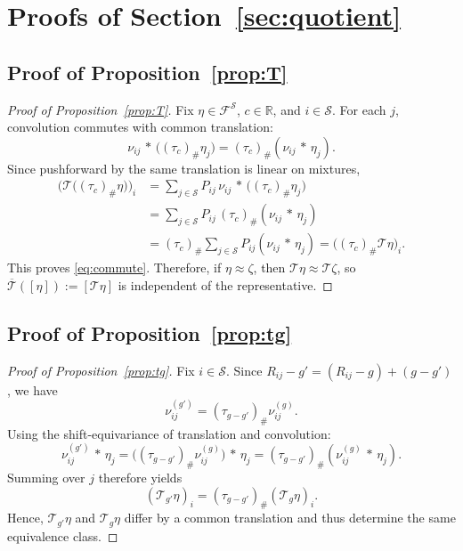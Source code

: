 \documentclass{article}
\newcommand{\X}{\mathcal{S}}
\newcommand{\R}{\mathbb{R}}
\begin{document}
\newpage
\section{Proofs of Section~\ref{sec:quotient}}\label{app:A}

\subsection{Proof of Proposition~\ref{prop:T}}
\begin{proof}[Proof of Proposition~\ref{prop:T}]
Fix $\eta \in \mathcal F^\X$, $c \in \R$, and $i \in \X$. For each $j$, convolution commutes with common translation:
\begin{equation}
\nu_{ij}\,\ast\,\bigl((\tau_c)_\# \eta_j \bigr) = (\tau_c)_\#(\nu_{ij}\,\ast\,\eta_j).
\end{equation}
Since pushforward by the same translation is linear on mixtures,
\begin{equation}
\begin{aligned}
\bigl(\mathcal T\bigl((\tau_c)_\#\eta\bigr)\bigr)_i &= \sum_{j \in \X}P_{ij} \,\nu_{ij}\,\ast\,\bigl((\tau_c)_\#\eta_j\bigr)\\
&=\sum_{j\in\X} P_{ij}\,(\tau_c)_\# (\nu_{ij}\,\ast\,\eta_j)\\
&=(\tau_c)_\# \sum_{j \in \X} P_{ij} (\nu_{ij}\,\ast\,\eta_j) = \bigl((\tau_c)_\# \mathcal T \eta \bigr)_i.
\end{aligned}
\end{equation}
This proves \eqref{eq:commute}. Therefore, if $\eta \approx \zeta$, then $\mathcal T \eta\approx \mathcal T \zeta$, so $\overline{\mathcal T}([\eta]) := [\mathcal T \eta]$ is independent of the representative.
\end{proof}

\subsection{Proof of Proposition~\ref{prop:tg}}
\begin{proof}[Proof of Proposition~\ref{prop:tg}]
Fix $i \in \X$. Since $R_{ij} - g' = (R_{ij} -g) + (g - g')$, we have
\begin{equation}
\nu^{(g')}_{ij} = (\tau_{g-g'})_\# \nu^{(g)}_{ij}.
\end{equation}
Using the shift-equivariance of translation and convolution:
\begin{equation}
\nu^{(g')}_{ij}\,\ast\,\eta_j = \bigl((\tau_{g-g'})_\#\nu^{(g)}_{ij} \bigr)\,\ast\,\eta_j = (\tau_{g-g'})_\#(\nu^{(g)}_{ij}\,\ast\,\eta_j).
\end{equation}
Summing over $j$ therefore yields
\begin{equation}
(\mathcal T_{g'}\eta)_i = (\tau_{g-g'})_\#(\mathcal T_g \eta)_i.
\end{equation}
Hence, $\mathcal T_{g'}\eta$ and $\mathcal T_g \eta$ differ by a common translation and thus determine the same equivalence class.
\end{proof}
\end{document}

